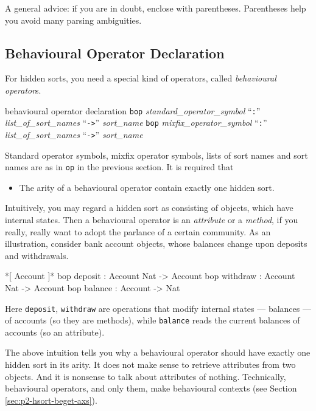 \documentclass[a4paper]{memoir}
\begin{document}
\begin{warning}
  A general advice: if you are in doubt, enclose with parentheses.
  Parentheses help you avoid many parsing ambiguities.
\end{warning}

\subsection{Behavioural Operator Declaration}\label{sec:p2-beh-op-decl}

For hidden sorts, you need a special kind of operators, called
{\em behavioural operator\/}s.

\begin{bsyntax} behavioural operator declaration  \Hline
\texttt{bop} \textit{standard\_operator\_symbol} ``\texttt{:}'' \textit{list\_of\_sort\_names} ``\texttt{->}'' \textit{sort\_name}
\texttt{bop} \textit{mixfix\_operator\_symbol} ``\texttt{:}'' \textit{list\_of\_sort\_names} ``\texttt{->}'' \textit{sort\_name}
\end{bsyntax}

Standard operator symbols, mixfix operator symbols, lists of sort names
and sort names are as in \verb|op| in the previous section.
It is required that
\begin{itemize}
\item The arity of a behavioural operator contain exactly one
  hidden sort.
\end{itemize}
Intuitively, you may regard a hidden sort as consisting of objects, which
have internal states. Then a behavioural operator
is an {\em attribute} or a {\em method},
if you really, really want to adopt the parlance of a certain community.
As an illustration,
consider bank account objects, whose balances change upon deposits and
withdrawals.
\begin{vvtm}
\begin{ccode}
  *[ Account ]*
  bop deposit : Account Nat -> Account
  bop withdraw : Account Nat -> Account
  bop balance : Account -> Nat
\end{ccode}
\end{vvtm}
Here \verb|deposit|, \verb|withdraw| are operations that modify
internal states --- balances --- of accounts (so they are methods),
while \verb|balance| reads the current balances of accounts
(so an attribute).

The above intuition tells you why a behavioural operator should have
exactly one hidden sort in its arity. It does not make sense to
retrieve attributes from two objects. And it is nonsense to talk about
attributes of nothing. Technically, behavioural operators, and only them,
make behavioural contexts (see Section \ref{sec:p2-hsort-beget-axs}).
\end{document}
